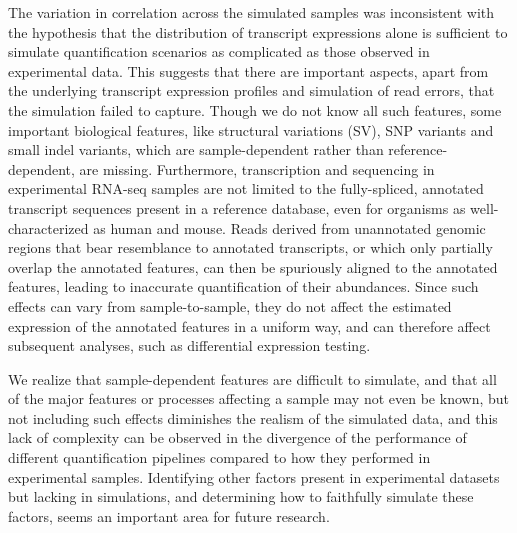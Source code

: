 The variation in correlation across the simulated samples was inconsistent 
with the hypothesis that the distribution of
transcript expressions alone is sufficient to simulate quantification scenarios
as complicated as those observed in experimental data. This suggests that there
are important aspects, apart from the underlying transcript expression profiles
and simulation of read errors, that the simulation failed to capture. Though
we do not know all such features, some important biological features, like
structural variations (SV), SNP variants and small indel variants, which are
sample-dependent rather than reference-dependent, are missing. 
  Furthermore, transcription and sequencing in experimental RNA-seq samples are
  not limited to the fully-spliced, annotated transcript sequences present in a
  reference database, even for organisms as well-characterized as human and
  mouse. Reads derived from unannotated genomic regions that bear resemblance to
  annotated transcripts, or which only partially overlap the annotated features,
  can then be spuriously aligned to the annotated features, leading to
  inaccurate quantification of their abundances. Since such effects can vary from sample-to-sample,
  they do not affect the estimated expression of the annotated features in a uniform way, and can
  therefore affect subsequent analyses, such as differential expression testing.

We realize that sample-dependent features are difficult to simulate, and that all
of the major features or processes affecting a sample may not even be known, but
not including such effects diminishes the realism of the simulated data, and
this lack of complexity can be observed in the divergence of the performance of
different quantification pipelines compared to how they performed in experimental
samples. Identifying other factors present in experimental datasets but lacking
in simulations, and determining how to faithfully simulate these factors, seems
an important area for future research. 

